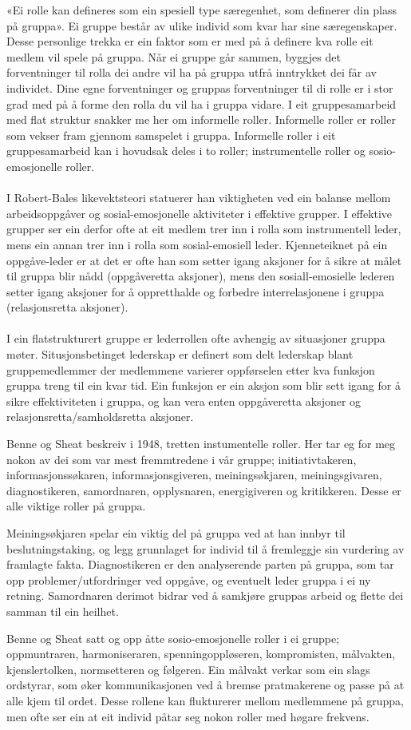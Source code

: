 «Ei rolle kan defineres som ein spesiell type særegenhet, som definerer din plass på gruppa». Ei gruppe består av ulike individ som kvar har sine særegenskaper. Desse personlige trekka er ein faktor som er med på å definere kva rolle eit medlem vil spele på gruppa.  Når ei gruppe går sammen, byggjes det forventninger til rolla dei andre vil ha på gruppa utfrå inntrykket dei får av individet. Dine egne forventninger og gruppas forventninger til di rolle er i stor grad med på å forme den rolla du vil ha i gruppa vidare. I eit gruppesamarbeid med flat struktur snakker me her om informelle roller. Informelle roller er roller som vekser fram gjennom samspelet i gruppa. Informelle roller i eit gruppesamarbeid kan i hovudsak deles i to roller; instrumentelle roller og sosio-emosjonelle roller. 
\\
\\
I Robert-Bales likevektsteori statuerer han viktigheten ved ein balanse mellom arbeidsoppgåver og sosial-emosjonelle aktiviteter i effektive grupper. I effektive grupper ser ein derfor ofte at eit medlem trer inn i rolla som instrumentell leder, mens ein annan trer inn i rolla som sosial-emosiell leder. Kjenneteiknet på ein oppgåve-leder er at det er ofte han som setter igang aksjoner for å sikre at målet til gruppa blir nådd (oppgåveretta aksjoner), mens den sosiall-emosielle lederen setter igang aksjoner for å oppretthalde og forbedre interrelasjonene i gruppa (relasjonsretta aksjoner).
\\
\\
I ein flatstrukturert gruppe er lederrollen ofte avhengig av situasjoner gruppa møter. Situsjonsbetinget lederskap er definert som delt lederskap blant gruppemedlemmer der medlemmene varierer oppførselen etter kva funksjon gruppa treng til ein kvar tid. Ein funksjon er ein aksjon som blir sett igang for å sikre effektiviteten i gruppa, og kan vera enten oppgåveretta aksjoner og relasjonsretta/samholdsretta aksjoner. 

Benne og Sheat beskreiv i 1948, tretten instumentelle roller. Her tar eg for meg nokon av dei som var mest fremmtredene i vår gruppe; initiativtakeren, informasjonssøkaren, informasjonsgiveren, meiningsøkjaren, meiningsgivaren, diagnostikeren, samordnaren, opplysnaren, energigiveren og kritikkeren. Desse er alle viktige roller på gruppa. 

Meiningsøkjaren spelar ein viktig del på gruppa ved at han innbyr til beslutningstaking, og legg grunnlaget for individ til å fremleggje sin vurdering av framlagte fakta. Diagnostikeren er den analyserende parten på gruppa, som tar opp problemer/utfordringer ved oppgåve, og eventuelt leder gruppa i ei ny retning. Samordnaren derimot bidrar ved å samkjøre gruppas arbeid og flette dei samman til ein heilhet.

Benne og Sheat satt og opp åtte sosio-emosjonelle roller i ei gruppe; oppmuntraren, harmoniseraren, spenningoppløseren, kompromisten, målvakten, kjenslertolken, normsetteren og følgeren. Ein målvakt verkar som ein slags ordstyrar, som øker kommunikasjonen ved å bremse pratmakerene og passe på at alle kjem til ordet. Desse rollene kan flukturerer mellom medlemmene på gruppa, men ofte ser ein at eit individ påtar seg nokon roller med høgare frekvens.
